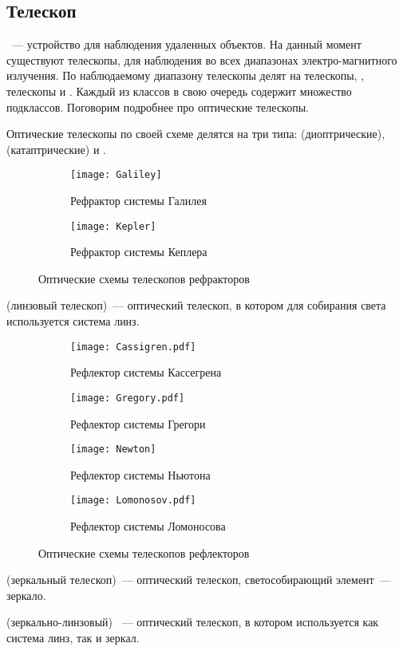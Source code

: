 \subsection{Телескоп}
~--- устройство для наблюдения удаленных объектов. На данный момент существуют телескопы, для наблюдения во всех  диапазонах электро-магнитного излучения. По наблюдаемому диапазону телескопы делят на  телескопы, , телескопы и . Каждый из классов в свою очередь содержит множество подклассов. Поговорим подробнее про оптические телескопы.

Оптические телескопы по своей схеме делятся на три типа:  (диоптрические),  (катаптрические) и .

\vspace{-.3pc}
\begin{figure}[h!]
	\centering
	\begin{subfigure}{0.49\tw}
		\texttt{[image: Galiley]}
		\caption{Рефрактор системы Галилея}
	 \end{subfigure}
	 \hfill
	\begin{subfigure}{0.49\tw}
		\texttt{[image: Kepler]}
		\caption{Рефрактор системы Кеплера}
		 \label{Kepler}
	 \end{subfigure}
	 \caption{Оптические схемы телескопов рефракторов}
\end{figure}
 (линзовый телескоп)~---  оптический телескоп, в котором для собирания света используется система линз.

\vspace{-.3pc}
\begin{figure}[h!]
	 \begin{subfigure}{0.49\tw}
		\texttt{[image: Cassigren.pdf]}
		\caption{Рефлектор системы Кассегрена}
	 \end{subfigure}
	 \hfill
	 \begin{subfigure}{0.49\tw}
		\texttt{[image: Gregory.pdf]}
		\caption{Рефлектор системы Грегори}
		\label{Gregory}
	 \end{subfigure}
	 \vskip4pt
	\begin{subfigure}{0.49\tw}
		\texttt{[image: Newton]}
 		\caption{Рефлектор системы Ньютона}
	\end{subfigure}
	\hfill
	\begin{subfigure}{0.49\tw}
		\texttt{[image: Lomonosov.pdf]}
		\caption{Рефлектор системы Ломоносова}
	\end{subfigure}
	\caption{Оптические схемы телескопов рефлекторов}
\end{figure}
 (зеркальный телескоп)~---  оптический телескоп, светособирающий элемент~--- зеркало.

 (зеркально-линзовый) ~--- оптический телескоп, в котором используется как система линз, так и зеркал.